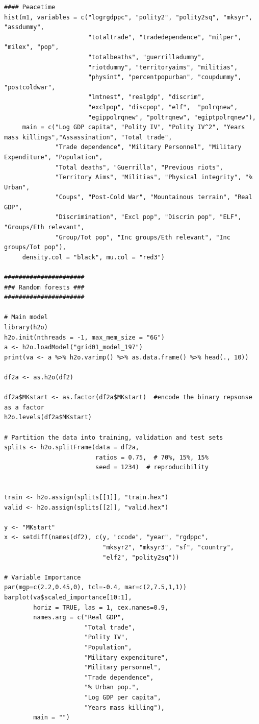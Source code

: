 \begin{verbatim}
#### Peacetime
hist(m1, variables = c("logrgdppc", "polity2", "polity2sq", "mksyr", "assdummy",
                       "totaltrade", "tradedependence", "milper", "milex", "pop",
                       "totalbeaths", "guerrilladummy",
                       "riotdummy", "territoryaims", "militias",
                       "physint", "percentpopurban", "coupdummy", "postcoldwar",
                       "lmtnest", "realgdp", "discrim",
                       "exclpop", "discpop", "elf",  "polrqnew",
                       "egippolrqnew", "poltrqnew", "egiptpolrqnew"),
     main = c("Log GDP capita", "Polity IV", "Polity IV^2", "Years mass killings","Assassination", "Total trade", 
              "Trade dependence", "Military Personnel", "Military Expenditure", "Population",
              "Total deaths", "Guerrilla", "Previous riots",
              "Territory Aims", "Militias", "Physical integrity", "% Urban",
              "Coups", "Post-Cold War", "Mountainous terrain", "Real GDP",
              "Discrimination", "Excl pop", "Discrim pop", "ELF", "Groups/Eth relevant", 
              "Group/Tot pop", "Inc groups/Eth relevant", "Inc groups/Tot pop"),
     density.col = "black", mu.col = "red3")

######################
### Random forests ###
######################

# Main model
library(h2o)
h2o.init(nthreads = -1, max_mem_size = "6G") 
a <- h2o.loadModel("grid01_model_197")
print(va <- a %>% h2o.varimp() %>% as.data.frame() %>% head(., 10))

df2a <- as.h2o(df2)

df2a$MKstart <- as.factor(df2a$MKstart)  #encode the binary repsonse as a factor
h2o.levels(df2a$MKstart)

# Partition the data into training, validation and test sets
splits <- h2o.splitFrame(data = df2a, 
                         ratios = 0.75,  # 70%, 15%, 15%
                         seed = 1234)  # reproducibility


train <- h2o.assign(splits[[1]], "train.hex")   
valid <- h2o.assign(splits[[2]], "valid.hex") 

y <- "MKstart"
x <- setdiff(names(df2), c(y, "ccode", "year", "rgdppc",
                           "mksyr2", "mksyr3", "sf", "country",
                           "elf2", "polity2sq"))  

# Variable Importance
par(mgp=c(2.2,0.45,0), tcl=-0.4, mar=c(2,7.5,1,1))
barplot(va$scaled_importance[10:1],
        horiz = TRUE, las = 1, cex.names=0.9,
        names.arg = c("Real GDP",
                      "Total trade",
                      "Polity IV",
                      "Population", 
                      "Military expenditure",
                      "Military personnel",
                      "Trade dependence", 
                      "% Urban pop.",
                      "Log GDP per capita",
                      "Years mass killing"),
        main = "")



\end{verbatim}
